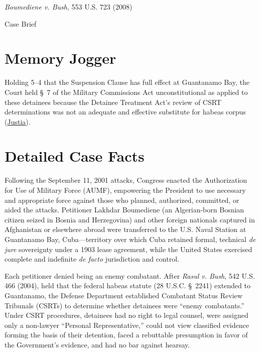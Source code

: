 \documentclass[12pt]{article}
\begin{document}
\begin{center}
{\LARGE \textit{Boumediene v. Bush}, 553 U.S. 723 (2008)\par}
\vspace{0.8em}
{\large Case Brief\par}
\end{center}
\vspace{1em}

\section{Memory Jogger}
Holding 5--4 that the Suspension Clause has full effect at Guantanamo Bay, the Court held \S~7 of the Military Commissions Act unconstitutional as applied to these detainees because the Detainee Treatment Act's review of CSRT determinations was not an adequate and effective substitute for habeas corpus (\href{https://supreme.justia.com/cases/federal/us/553/723/}{Justia}).

\section{Detailed Case Facts}
Following the September 11, 2001 attacks, Congress enacted the Authorization for Use of Military Force (AUMF), empowering the President to use necessary and appropriate force against those who planned, authorized, committed, or aided the attacks. Petitioner Lakhdar Boumediene (an Algerian-born Bosnian citizen seized in Bosnia and Herzegovina) and other foreign nationals captured in Afghanistan or elsewhere abroad were transferred to the U.S. Naval Station at Guantanamo Bay, Cuba---territory over which Cuba retained formal, technical \textit{de jure} sovereignty under a 1903 lease agreement, while the United States exercised complete and indefinite \textit{de facto} jurisdiction and control.

Each petitioner denied being an enemy combatant. After \textit{Rasul v. Bush}, 542 U.S. 466 (2004), held that the federal habeas statute (28 U.S.C. \S~2241) extended to Guantanamo, the Defense Department established Combatant Status Review Tribunals (CSRTs) to determine whether detainees were ``enemy combatants.'' Under CSRT procedures, detainees had no right to legal counsel, were assigned only a non-lawyer ``Personal Representative,'' could not view classified evidence forming the basis of their detention, faced a rebuttable presumption in favor of the Government's evidence, and had no bar against hearsay.
\end{document}
